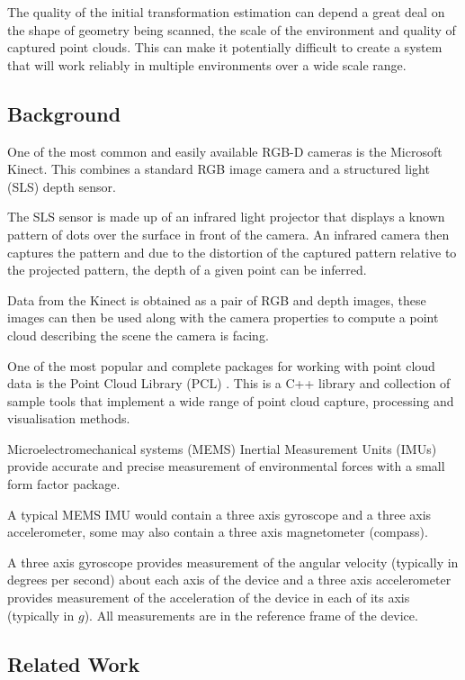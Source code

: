 \documentclass{entcs}
\begin{document}
The quality of the initial transformation estimation can depend a great deal on
the shape of geometry being scanned, the scale of the environment and quality of
captured point clouds. This can make it potentially difficult to create a system
that will work reliably in multiple environments over a wide scale range.

\subsection{Background}

One of the most common and easily available RGB-D cameras is the Microsoft
Kinect. This combines a standard RGB image camera and a structured light (SLS)
depth sensor.

The SLS sensor is made up of an infrared light projector that displays a known
pattern of dots over the surface in front of the camera. An infrared camera then
captures the pattern and due to the distortion of the captured pattern relative
to the projected pattern, the depth of a given point can be inferred.

Data from the Kinect is obtained as a pair of RGB and depth images, these images
can then be used along with the camera properties to compute a point cloud
describing the scene the camera is facing.

One of the most popular and complete packages for working with point cloud data
is the Point Cloud Library (PCL) \cite{Rusu_ICRA2011_PCL}. This is a C++ library
and collection of sample tools that implement a wide range of point cloud
capture, processing and visualisation methods.

Microelectromechanical systems (MEMS) Inertial Measurement Units (IMUs) provide
accurate and precise measurement of environmental forces with a small form
factor package.

A typical MEMS IMU would contain a three axis gyroscope and a three axis
accelerometer, some may also contain a three axis magnetometer (compass).

A three axis gyroscope provides measurement of the angular velocity (typically
in degrees per second) about each axis of the device and a three axis
accelerometer provides measurement of the acceleration of the device in each of
its axis (typically in $g$). All measurements are in the reference frame of the
device.

\subsection{Related Work}
\end{document}
